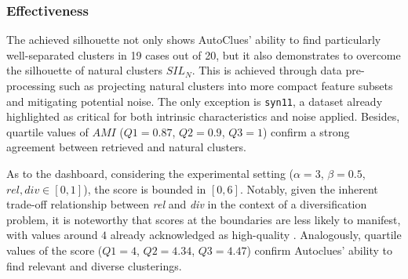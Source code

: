 \vspace{-0.5cm}
\subsubsection{Effectiveness}\label{sssec:effectiveness}
The achieved silhouette not only shows AutoClues' ability to find particularly well-separated clusters in 19 cases out of 20, but it also demonstrates to overcome the silhouette of natural clusters $SIL_N$. 
This is achieved through data pre-processing such as projecting natural clusters into more compact feature subsets and mitigating potential noise.
The only exception is \texttt{syn11}, a dataset already highlighted as critical for both intrinsic characteristics and noise applied. 
Besides, quartile values of $AMI$ ($Q1=0.87$, $Q2=0.9$, $Q3=1$) confirm a strong agreement between retrieved and natural clusters. 

As to the dashboard, considering the experimental setting ($\alpha=3$, $\beta=0.5$,  $rel, div \in [0, 1]$), the score is bounded in $[0, 6]$.
Notably, given the inherent trade-off relationship between \textit{rel} and \textit{div} in the context of a diversification problem, it is noteworthy that scores at the boundaries are less likely to manifest,
with values around $4$ already acknowledged as high-quality \cite{vieira2011query}.
Analogously, quartile values of the score ($Q1=4$, $Q2=4.34$, $Q3=4.47$) confirm Autoclues' ability to find relevant and diverse clusterings.

